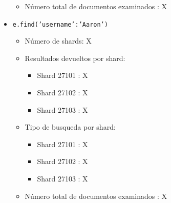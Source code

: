 \documentclass{article}
\begin{document}
\begin{itemize}
\begin{itemize}
          \item Número total de documentos examinados : X
        \end{itemize}
      \item \texttt{e.find({'username':'Aaron'})}
        \begin{itemize}
          \item Número de shards: X
          \item Resultados devueltos por shard:
            \begin{itemize}
              \item Shard 27101 : X
              \item Shard 27102 : X
              \item Shard 27103 : X
            \end{itemize}
          \item Tipo de busqueda por shard:
            \begin{itemize}
              \item Shard 27101 : X
              \item Shard 27102 : X
              \item Shard 27103 : X
            \end{itemize}
          \item Número total de documentos examinados : X
        \end{itemize}
    \end{itemize}
\end{document}
